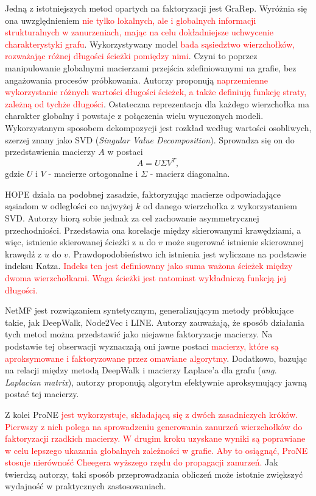         Jedną z istotniejszych metod opartych na faktoryzacji jest GraRep\cite{Cao_Lu_Xu_2015}. Wyróżnia się ona uwzględnieniem \textcolor{red}{nie tylko lokalnych, ale i globalnych informacji strukturalnych w zanurzeniach, mając na celu dokładniejsze uchwycenie charakterystyki grafu}. Wykorzystywany model \textcolor{red}{bada sąsiedztwo wierzchołków, rozważając różnej długości ścieżki pomiędzy nimi}. Czyni to poprzez manipulowanie globalnymi macierzami przejścia zdefiniowanymi na grafie, bez angażowania procesów próbkowania. Autorzy proponują \textcolor{red}{naprzemienne wykorzystanie różnych wartości długości ścieżek, a także definiują funkcję straty, zależną od tychże długości}. Ostateczna reprezentacja dla każdego wierzchołka ma charakter globalny i powstaje z połączenia wielu wyuczonych modeli. Wykorzystanym sposobem dekompozycji jest rozkład według wartości osobliwych, szerzej znany jako SVD (\emph{Singular Value Decomposition}). Sprowadza się on do przedstawienia macierzy $A$ w postaci 
        \[
            A = U \Sigma V^T,
        \]
        gdzie $U$ i $V$ - macierze ortogonalne i $\Sigma$ - macierz diagonalna.
         
        HOPE\cite{Ou_Cui_Pei_Zhang_Zhu_2016} działa na podobnej zasadzie, faktoryzując macierze odpowiadające sąsiadom w odległości co najwyżej $k$ od danego wierzchołka z wykorzystaniem SVD. Autorzy biorą sobie jednak za cel zachowanie asymmetrycznej przechodniości. Przedstawia ona korelacje między skierowanymi krawędziami, a więc, istnienie skierowanej ścieżki z $u$ do $v$ może sugerować istnienie skierowanej krawędź z $u$ do $v$.  Prawdopodobieństwo ich istnienia jest wyliczane na podstawie indeksu Katza\cite{Katz_1953}. \textcolor{red}{Indeks ten jest definiowany jako suma ważona ścieżek między dwoma wierzchołkami. Waga ścieżki jest natomiast wykładniczą funkcją jej długości.} 
        
        NetMF\cite{Qiu_Dong_Ma_Li_Wang_Tang_2018} jest rozwiązaniem syntetycznym, generalizującym  metody próbkujące takie, jak DeepWalk, Node2Vec i LINE. Autorzy zauważają, że sposób działania tych metod można przedstawić jako niejawne faktoryzacje macierzy. Na podstawie tej obserwacji wyznaczają oni jawne postaci \textcolor{red}{macierzy, które są aproksymowane i faktoryzowane przez omawiane algorytmy}. Dodatkowo, bazując na relacji między metodą DeepWalk i macierzy Laplace'a dla grafu (\emph{ang. Laplacian matrix}), autorzy proponują algorytm efektywnie aproksymujący jawną postać tej macierzy.
        
        Z kolei ProNE\cite{Zhang_Dong_Wang_Tang_Ding_2019} \textcolor{red}{jest wykorzystuje, składającą się z dwóch zasadniczych króków. Pierwszy z nich polega na sprowadzeniu generowania zanurzeń wierzchołków do faktoryzacji rzadkich macierzy. W drugim kroku uzyskane wyniki są poprawiane w celu lepszego ukazania globalnych zależności w grafie. Aby to osiągnąć, ProNE stosuje nierówność Cheegera wyższego rzędu\cite{Lee_Gharan_Trevisan_2014} do propagacji zanurzeń.} Jak twierdzą autorzy, taki sposób przeprowadzania obliczeń może istotnie zwiększyć wydajność w praktycznych zastosowaniach.

